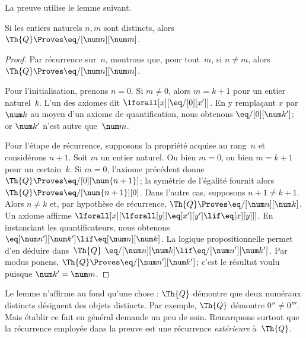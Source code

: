 \documentclass[../../../include/open-logic-section]{subfiles}
\begin{document}
La preuve utilise le lemme suivant.

\begin{lem}
Si les entiers naturels $n,m$ sont distincts, alors
$\Th{Q}\Proves\eq/[\num n][\num m]$.
\end{lem}

\begin{proof}
Par récurrence sur~$n$, montrons que, pour tout~$m$, si $n\neq m$,
alors $\Th{Q}\Proves\eq/[\num n][\num m]$.

Pour l'initialisation, prenons $n=0$. Si $m\neq0$, alors
$m=k+1$ pour un entier naturel~$k$. L'un des axiomes dit
$\lforall[x][\eq/[0][x']]$. En y remplaçant $x$ par~$\num k$
au moyen d'un axiome de quantification, nous obtenons
$\eq/[0][\num k']$; or $\num k'$ n'est autre que~$\num m$.

Pour l'étape de récurrence, supposons la propriété acquise au
rang~$n$ et considérons $n+1$. Soit $m$ un entier naturel.
Ou bien $m=0$, ou bien $m=k+1$ pour un certain~$k$. Si $m=0$,
l'axiome précédent donne
$\Th{Q}\Proves\eq/[0][\num{n+1}]$; la symétrie de
l'égalité fournit alors
$\Th{Q}\Proves\eq/[\num{n+1}][0]$. Dans l'autre cas,
supposons $n+1\neq k+1$. Alors $n\neq k$ et, par hypothèse de
récurrence, $\Th{Q}\Proves\eq/[\num n][\num k]$. Un axiome
affirme $\lforall[x][\lforall[y][\eq[x'][y']\lif\eq[x][y]]]$.
En instanciant les quantificateurs, nous obtenons
$\eq[\num n'][\num k']\lif\eq[\num n][\num k]$. La logique
propositionnelle permet d'en déduire dans~$\Th{Q}$
$\eq/[\num n][\num k]\lif\eq/[\num n'][\num k']$.
Par modus ponens, $\Th{Q}\Proves\eq/[\num n'][\num k']$;
c'est le résultat voulu puisque $\num k'=\num m$.
\end{proof}

\begin{explain}
Le lemme n'affirme au fond qu'une chose : $\Th{Q}$ démontre que
deux numéraux distincts désignent des objets distincts. Par
exemple, $\Th{Q}$ démontre $0''\neq0'''$. Mais établir ce fait
en général demande un peu de soin. Remarquons surtout que la
récurrence employée dans la preuve est une récurrence
\emph{extérieure} à~$\Th{Q}$.
\end{explain}
\end{document}
